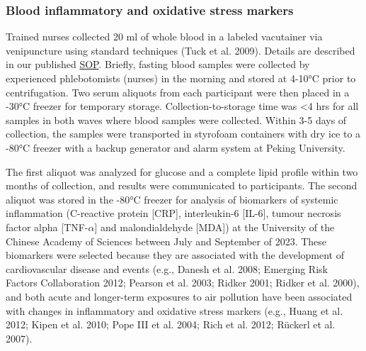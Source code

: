 \documentclass[
  letterpaper,
  DIV=11,
  numbers=noendperiod]{scrartcl}
\begin{document}
\subsubsection{Blood inflammatory and oxidative stress
markers}\label{blood-inflammatory-and-oxidative-stress-markers}

Trained nurses collected 20 ml of whole blood in a labeled vacutainer
via venipuncture using standard techniques (Tuck et al. 2009). Details
are described in our published \href{https://osf.io/zwpfg}{SOP}.
Briefly, fasting blood samples were collected by experienced
phlebotomists (nurses) in the morning and stored at 4-10°C prior to
centrifugation. Two serum aliquots from each participant were then
placed in a -30°C freezer for temporary storage. Collection-to-storage
time was \textless4 hrs for all samples in both waves where blood
samples were collected. Within 3-5 days of collection, the samples were
transported in styrofoam containers with dry ice to a -80°C freezer with
a backup generator and alarm system at Peking University.

The first aliquot was analyzed for glucose and a complete lipid profile
within two months of collection, and results were communicated to
participants. The second aliquot was stored in the -80°C freezer for
analysis of biomarkers of systemic inflammation (C-reactive protein
{[}CRP{]}, interleukin-6 {[}IL-6{]}, tumour necrosis factor alpha
{[}TNF-\(\alpha\){]} and malondialdehyde {[}MDA{]}) at the University of
the Chinese Academy of Sciences between July and September of 2023.
These biomarkers were selected because they are associated with the
development of cardiovascular disease and events (e.g., Danesh et al.
2008; Emerging Risk Factors Collaboration 2012; Pearson et al. 2003;
Ridker 2001; Ridker et al. 2000), and both acute and longer-term
exposures to air pollution have been associated with changes in
inflammatory and oxidative stress markers (e.g., Huang et al. 2012;
Kipen et al. 2010; Pope III et al. 2004; Rich et al. 2012; Rückerl et
al. 2007).
\end{document}
